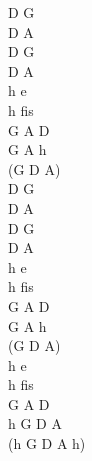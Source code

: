 \documentclass[a5paper, 10pt]{book}
\begin{document}
\begin{minipage}[t]{0.3\textwidth}
D G\\
D A \\
D G\\
D A\\
h e \\
h fis\\
G A D\\
G A h\\
(G D A)\\

D G\\
D A \\
D G\\
D A\\
h e \\
h fis\\
G A D\\
G A h\\
(G D A)\\

h e\\
h fis\\
G A D\\
h G D A\\
(h G D A h)\\
\end{minipage}

\newpage
\end{document}
